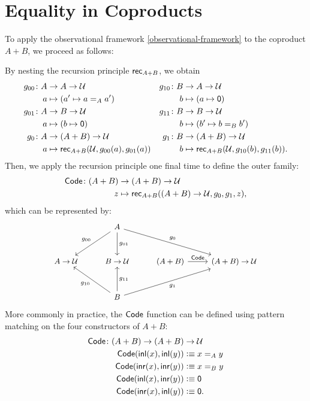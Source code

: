 \section{Equality in Coproducts}\label{equality-in-coproducts}

To apply the observational framework \ref{observational-framework} to the coproduct $A+B$, we proceed as follows:
\begin{description}[font=\normalfont\scshape]
    \item[Code family.] By nesting the recursion principle $\mathsf{rec}_{A+B}$, we obtain
    \begin{align*}
        g_{00}\colon A&\to A\to\univ & g_{10}\colon B&\to A\to\univ\\
        a&\mapsto(a'\mapsto a\eq Aa') & b&\mapsto(a\mapsto\fun0)\\
        g_{01}\colon A&\to B\to\univ & g_{11}\colon B&\to B\to\univ\\
        a&\mapsto(b\mapsto\fun0) & b&\mapsto(b'\mapsto b\eq Bb')\\
        g_0\colon A&\to(A+B)\to\univ & g_1\colon B&\to(A+B)\to\univ\\
        a&\mapsto\fun{rec}_{A+B}(\univ,g_{00}(a),g_{01}(a)) & b&\mapsto\fun{rec}_{A+B}(\univ,g_{10}(b),g_{11}(b)).
    \end{align*}
    Then, we apply the recursion principle one final time to define the outer family:
    \begin{align*}
        \fun{Code}\colon(A+B)&\to(A+B)\to\univ\\
        z&\mapsto\fun{rec}_{A+B}((A+B)\to\univ,g_0,g_1,z),
    \end{align*}
    which can be represented by:
    \[
        \begin{tikzcd}[row sep=large, font=\small]
            & A \arrow[ld,"g_{00}"'] \arrow[d,"g_{01}"] \arrow[rrd,"g_0"] \\
            A\to\univ & B\to\univ & (A+B) \arrow[r,"\fun{Code}"] & (A+B)\to\univ \\
            & B \arrow[lu,"g_{10}"] \arrow[u,"g_{11}"'] \arrow[rru,"g_1"']
        \end{tikzcd}
    \]
    More commonly in practice, the $\mathsf{Code}$ function can be defined using pattern matching on the four constructors of $A+B$:
    \begin{align*}
        \fun{Code}\colon(A+B)\to(A+B)&\to\univ\\
        \fun{Code}(\fun{inl}(x),\fun{inl}(y))&\defeq x\eq Ay\\
        \fun{Code}(\fun{inr}(x),\fun{inr}(y))&\defeq x\eq By\\
        \fun{Code}(\fun{inl}(x),\fun{inr}(y))&\defeq\fun0\\
        \fun{Code}(\fun{inr}(x),\fun{inl}(y))&\defeq\fun0.
    \end{align*}


\end{description}
